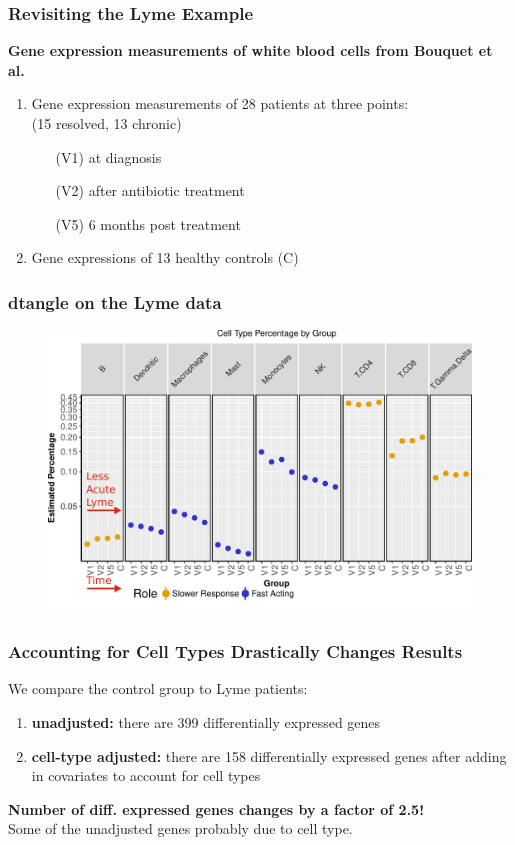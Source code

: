 \documentclass[usenames,dvipsnames,15pt]{beamer}
\renewcommand{\alert}[1]{{\color{NavyBlue} #1}}
\newcommand{\cbo}{\color{BurntOrange}}
\begin{document}
\begin{frame}
  \frametitle{Revisiting the Lyme Example}
  {\bf Gene expression measurements of white blood cells from Bouquet et al.}

  \begin{enumerate}
  \item Gene expression measurements of 28 patients at three points:\\
    (15 resolved, 13 chronic) \\
  \begin{enumerate}
  \item[\cbo(V1)] at diagnosis
  \item[\cbo(V2)] after antibiotic treatment
  \item[\cbo(V5)] 6 months post treatment
  \end{enumerate}
  \item Gene expressions of 13 healthy controls {\cbo(C)}
  \end{enumerate}

\end{frame}

\begin{frame}
  \frametitle{dtangle on the Lyme data}
  \vspace*{-.5cm}\begin{figure}
    \hspace*{-.9cm}\includegraphics[scale=.65]{pictures/ctypes.pdf}
  \end{figure}
\end{frame}

\begin{frame}
  \frametitle{Accounting for Cell Types Drastically Changes Results}
  We compare the control group to Lyme patients:
  \begin{enumerate}
    \item {\bf unadjusted:} there are {\cbo 399} differentially expressed genes
    \item {\bf cell-type adjusted:} there are {\cbo 158} differentially expressed genes after adding in covariates to account for cell types
  \end{enumerate}

  {\bf Number of diff. expressed genes changes by a factor of 2.5!}\\
  \alert{Some of the unadjusted genes probably due to cell type.}
\end{frame}
\end{document}
